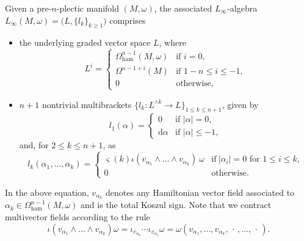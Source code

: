 \documentclass[pdftex]{sigma}
\numberwithin{equation}{section}
\newcommand{\ham}{\text{ham}}
\renewcommand{\d}{\mathrm{d}}
\begin{document}
\begin{Definition}\label{def:RogersAlgebra}
	Given a pre-$n$-plectic manifold $(M,\omega)$, the associated $L_\infty$-algebra $L_{\infty}(M,\omega)=\bigl(L,\{l_k\}_{k\geq 1}\bigr)$ comprises
	\begin{itemize}\itemsep=0pt
		\item
		the underlying graded vector space $L$, where
	\begin{equation*}
		L^i=\begin{cases}
			\Omega_{\ham}^{n-1}(M,\omega)
			& \text{if } i=0,
			\\
			\Omega^{n-1+i}(M)
		 	&  \text{if } 1-n \leq i\leq -1,
		 	\\			
			0 & \text{otherwise,}
		\end{cases}
	\end{equation*}

	\item
		$n+1$ nontrivial multibrackets $\bigl\lbrace l_k \colon L^{\wedge k} \to L\bigr\rbrace_{1\leq k\leq n+1}$, given by
	\begin{displaymath}
		l_1(\alpha) =
		\begin{cases}
			0 & \text{if~} |\alpha| = 0	,
			\\
			\d \alpha &  \text{if~} |\alpha| \leq -1,
		\end{cases}
	\end{displaymath}
	and, for $ 2 \leq k \leq n+1$, as
	\begin{displaymath}
		l_k(\alpha_1,\dots,\alpha_k) =
		\begin{cases}
			\varsigma(k) \iota( v_{\alpha_1}\wedge\dots\wedge v_{\alpha_k})~\omega
			&\text{if} \ |\alpha_i|=0 \text{ for } 1\leq i \leq k,
			\\
			0 & \text{otherwise.}		
		\end{cases}
	\end{displaymath}
	\end{itemize}
In the above equation, $ v_{\alpha_k}$ denotes any Hamiltonian vector field associated to $\alpha_k\in \Omega^{n-1}_{\ham}(M,\omega)$ and  is the total Koszul sign. Note that we contract multivector fields according to the rule
	 \[
		 \iota( v_{\alpha_1}\wedge\dots\wedge v_{\alpha_k}) \omega=\iota_{ v_{\alpha_k}}\cdots\iota_{ v_{\alpha_1}}\omega=\omega( v_{\alpha_1},\dots, v_{\alpha_k}, \,\cdot\,, \dots,\,\cdot\,).
	 \]
\end{Definition}
\end{document}

